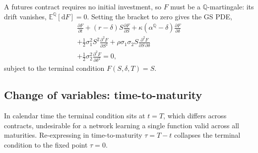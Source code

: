 \documentclass[sigconf, authorversion=true, nonacm=true]{acmart}
\newcommand{\convyield}{\delta}             %
\newcommand{\meanrev}{\kappa}               %
\newcommand{\longrun}{\alpha}               %
\begin{document}
\noindent
A futures contract requires no initial investment, so $F$ must be a $\mathbb{Q}$-martingale: its drift vanishes, $\mathbb{E}^{\mathbb{Q}}[\mathrm{d}F] = 0$. Setting the bracket to zero gives the GS PDE,
\begin{equation}
  \label{eq:app_pde_calendar}
  \begin{multlined}
  \frac{\partial F}{\partial t}
  + (r - \convyield)S\frac{\partial F}{\partial S}
  + \meanrev(\longrun^{\mathbb{Q}} - \convyield)\frac{\partial F}{\partial \convyield} \\
  + \frac{1}{2}\sigma_1^2 S^2\frac{\partial^2 F}{\partial S^2}
  + \rho\sigma_1\sigma_2 S\frac{\partial^2 F}{\partial S\,\partial \convyield} \\
  + \frac{1}{2}\sigma_2^2\frac{\partial^2 F}{\partial \convyield^2} = 0,
  \end{multlined}
\end{equation}
\noindent
subject to the terminal condition $F(S, \convyield, T) = S$.

\subsection{Change of variables: time-to-maturity}

In calendar time the terminal condition sits at $t = T$, which differs across contracts, undesirable for a network learning a single function valid across all maturities. Re-expressing in time-to-maturity $\tau = T - t$ collapses the terminal condition to the fixed point $\tau = 0$.
\end{document}
